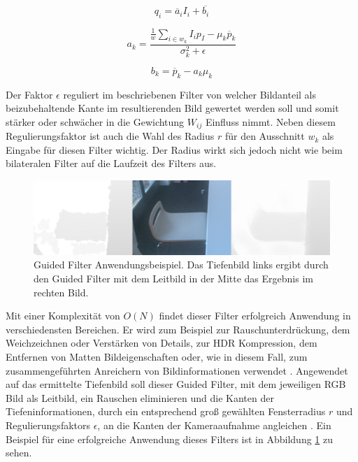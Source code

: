 \begin{equation} \label{eq:gf-final}
q_i = \overline{a}_iI_i+\overline{b_i}
\end{equation}

\begin{equation} \label{eq:gf-a}
a_k = \frac{\frac{1}{w} \sum_{i \in w_k} I_i p_I - \mu_k \overline{p}_k}{\sigma_k^2+\epsilon}
\end{equation}

\begin{equation} \label{eq:gf-b}
b_k = \overline{p}_k - a_k\mu_k
\end{equation}


Der Faktor \(\epsilon\) reguliert im beschriebenen Filter von \citet{he2010guided} welcher Bildanteil als beizubehaltende Kante im resultierenden Bild gewertet werden soll und somit stärker oder schwächer in die Gewichtung \(W_{ij}\) Einfluss nimmt. Neben diesem Regulierungsfaktor ist auch die Wahl des Radius \(r\) für den Ausschnitt \(w_k\) als Eingabe für diesen Filter wichtig. Der Radius wirkt sich jedoch nicht wie beim bilateralen Filter auf die Laufzeit des Filters aus. \citep{he2010guided} \\

\begin{figure}[h]
  \centering
	\includegraphics[width=1.0\textwidth]{content/images/methods/gf-result.png} 
  \caption{Guided Filter Anwendungsbeispiel. Das Tiefenbild links ergibt durch den Guided Filter mit dem Leitbild in der Mitte das Ergebnis im rechten Bild.}
  \label{fig:gf-result}
\end{figure}

Mit einer Komplexität von \(O(N)\) findet dieser Filter erfolgreich Anwendung  in verschiedensten Bereichen. Er wird zum Beispiel zur Rauschunterdrückung, dem Weichzeichnen oder Verstärken von Details, zur HDR Kompression, dem Entfernen von Matten Bildeigenschaften oder, wie in diesem Fall, zum zusammengeführten Anreichern von Bildinformationen verwendet \citep{he2010guided}. Angewendet auf das ermittelte Tiefenbild soll dieser Guided Filter, mit dem jeweiligen RGB Bild als Leitbild, ein Rauschen eliminieren und die Kanten der Tiefeninformationen, durch ein entsprechend groß gewählten Fensterradius \(r\) und Regulierungsfaktors \(\epsilon\), an die Kanten der Kameraaufnahme angleichen \citep{liu2012guided}. Ein Beispiel für eine erfolgreiche Anwendung dieses Filters ist in Abbildung \ref{fig:gf-result} zu sehen.


